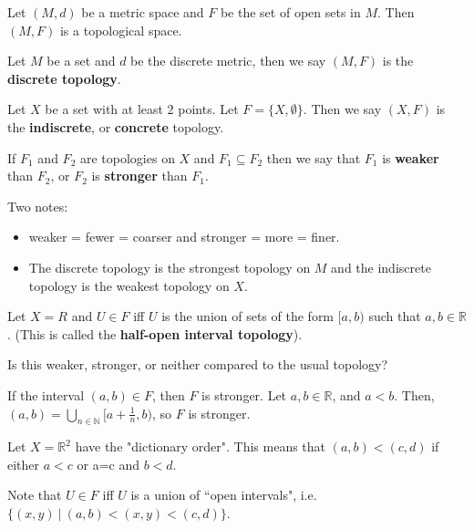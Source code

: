\begin{example}
Let $(M,d)$ be a metric space and $F$ be the set of open sets in $M$.  Then $(M,F)$ is a topological space.
\end{example}

\begin{definition}  Let $M$ be a set and $d$ be the discrete metric, then we say $(M,F)$ is the {\bf discrete topology}.
\end{definition}

\begin{definition}  Let $X$ be a set with at least 2 points.  Let $F=\{X,\emptyset\}$.  Then we say $(X,F)$ is the {\bf indiscrete}, or {\bf concrete} topology.
\end{definition}

\begin{definition}
If $F_{1}$ and $F_{2}$ are topologies on $X$ and $F_{1}\subseteq F_{2}$ then we say that $F_{1}$ is {\bf weaker} than $F_{2}$, or $F_{2}$ is {\bf stronger} than $F_{1}$.
\end{definition}

Two notes:
\begin{itemize}
\item weaker = fewer = coarser and stronger = more = finer.
\item The discrete topology is the strongest topology on $M$ and the indiscrete topology is the weakest topology on $X$.
\end{itemize}

\begin{example}
Let $X=R$ and $U\in F$ iff $U$ is the union of sets of the form $[a,b)$ such that $a,b\in \mathbb{R}$.  (This is called the {\bf half-open interval topology}).
\end{example}

Is this weaker, stronger, or neither compared to the usual topology?

If the interval $(a,b) \in F$, then $F$ is stronger.  Let $a,b \in \mathbb{R}$, and $a<b$.  Then, $(a,b)=\bigcup_{n\in \mathbb{N}}[a+\frac{1}{n},b)$, so $F$ is stronger.

\begin{example}
Let $X=\mathbb{R}^{2}$ have the "dictionary order".  This means that $(a,b)<(c,d)$ if either $a<c$ or a=c and $b<d$.
\end{example}

Note that $U\in F$ iff $U$ is a union of ``open intervals", i.e. $\{(x,y)\ |\ (a,b)<(x,y)<(c,d)\}$.

